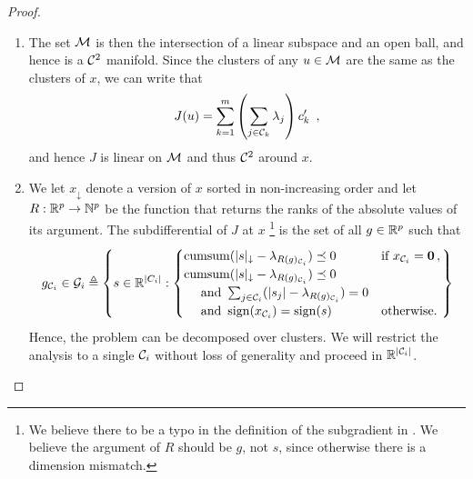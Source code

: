 \begin{proof}
	\begin{enumerate}
		\item The set $\mathcal{M}$ is then the intersection of a linear subspace and an open ball, and hence is a $\mathcal{C}^2$ manifold.
		      Since the clusters of any $u\in\mathcal{M}$ are the same as the clusters of $x$, we can write that
		      \begin{align}{}
			      J(u) = \sum_{k=1}^m \left( \sum_{j \in \mathcal{C}_k} \lambda_j \right)c_k' \enspace ,
		      \end{align}
		      and hence $J$ is linear on $\mathcal{M}$ and thus $\mathcal{C}^2$ around $x$.
		\item We let $x_\downarrow$ denote a version of \(x\) sorted in non-increasing order and let $R:\mathbb{R}^p \rightarrow \mathbb{N}^p$ be the function that returns the ranks of the absolute values of its argument. The subdifferential of $J$ at $x$ \parencite[Thm. 1]{larsson2020c}\footnote{We believe there to be a typo in the definition of the subgradient in \parencite[Thm. 1]{larsson2020c}. We believe the argument of \(R\) should be \(g\), not \(s\), since otherwise there is a dimension mismatch.} is the set of all $g\in\mathbb{R}^p$ such that
		      \begin{align}\label{eq:slope_subdiff}
			      g_{\mathcal{C}_i} \in \mathcal{G}_i \triangleq \left \{ s \in \mathbb{R}^{|C_i|} :
			      \begin{cases}
				      \operatorname{cumsum}(|s|_{\downarrow} - \lambda_{R(g)_{\mathcal{C}_i}}) \preceq 0 & \text{if } x_{\mathcal{C}_i} = \textbf{0} \, , \\
				      \operatorname{cumsum}(|s|_{\downarrow} - \lambda_{R(g)_{\mathcal{C}_i}}) \preceq 0                                          \\
				      \quad \text{ and } \sum_{j\in \mathcal{C}_i} (|s_j| - \lambda_{R(g)_{\mathcal{C}_i}}) = 0                             \\
				      \quad \text{ and } \operatorname{sign}(x_{\mathcal{C}_i}) =  \operatorname{sign}(s)              & \mathrm{otherwise.}
			      \end{cases}
			      \right \}
		      \end{align}
		      Hence, the problem can be decomposed over clusters.
		      We will restrict the analysis to a single $\mathcal{C}_i$ without loss of generality and proceed in $\mathbb{R}^{|\mathcal{C}_i|}$.
		      \begin{itemize}


\end{itemize}
\end{enumerate}
\end{proof}
